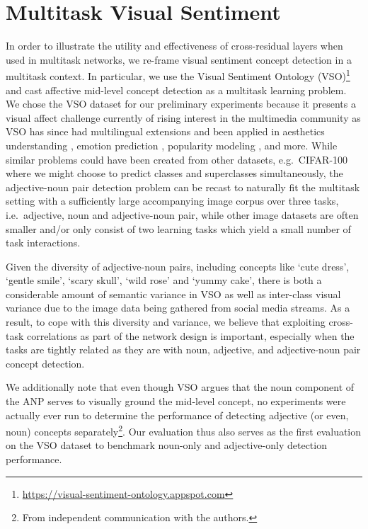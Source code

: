\documentclass{sig-alternate-05-2015}
\begin{document}
\section{Multitask Visual Sentiment}
\label{sec:mt_visual_sentiment}

In order to illustrate the utility and effectiveness of cross-residual layers when used in multitask networks, we re-frame visual sentiment concept detection in a multitask context.
In particular, we use the Visual Sentiment Ontology (VSO)\footnote{\url{https://visual-sentiment-ontology.appspot.com}} \cite{borth_2013} and cast affective mid-level concept detection as a multitask learning problem.
We chose the VSO dataset for our preliminary experiments because it presents a visual affect challenge currently of rising interest in the multimedia community as VSO has since had multilingual extensions \cite{jou_2015} and been applied in aesthetics understanding \cite{subh_2013}, emotion prediction \cite{jiang_2014,jou_2014}, popularity modeling \cite{khosla_2014}, and more.
While similar problems could have been created from other datasets, e.g.~CIFAR-100 where we might choose to predict classes and superclasses simultaneously, the adjective-noun pair detection problem can be recast to naturally fit the multitask setting with a sufficiently large accompanying image corpus over three tasks, i.e.~adjective, noun and adjective-noun pair, while other image datasets are often smaller and/or only consist of two learning tasks which yield a small number of task interactions.

Given the diversity of adjective-noun pairs, including concepts like `cute dress', `gentle smile', `scary skull', `wild rose' and `yummy cake', there is both a considerable amount of semantic variance in VSO as well as inter-class visual variance due to the image data being gathered from social media streams.
As a result, to cope with this diversity and variance, we believe that exploiting cross-task correlations as part of the network design is important, especially when the tasks are tightly related as they are with noun, adjective, and adjective-noun pair concept detection.

We additionally note that even though VSO \cite{borth_2013} argues that the noun component of the ANP serves to visually ground the mid-level concept, no experiments were actually ever run to determine the performance of detecting adjective (or even, noun) concepts separately\footnote{From independent communication with the authors.}.
Our evaluation thus also serves as the first evaluation on the VSO dataset to benchmark noun-only and adjective-only detection performance.
\end{document}
